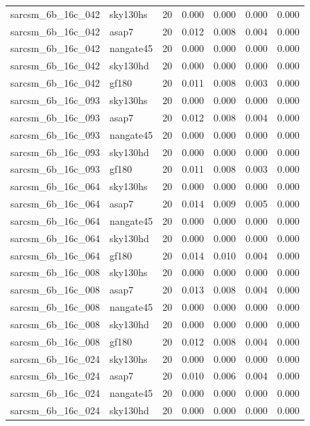 \begin{tabular}{llrrrrr}
sarcsm\_6b\_16c\_042 & sky130hs & 20 & 0.000 & 0.000 & 0.000 & 0.000 \\
sarcsm\_6b\_16c\_042 & asap7 & 20 & 0.012 & 0.008 & 0.004 & 0.000 \\
sarcsm\_6b\_16c\_042 & nangate45 & 20 & 0.000 & 0.000 & 0.000 & 0.000 \\
sarcsm\_6b\_16c\_042 & sky130hd & 20 & 0.000 & 0.000 & 0.000 & 0.000 \\
sarcsm\_6b\_16c\_042 & gf180 & 20 & 0.011 & 0.008 & 0.003 & 0.000 \\
sarcsm\_6b\_16c\_093 & sky130hs & 20 & 0.000 & 0.000 & 0.000 & 0.000 \\
sarcsm\_6b\_16c\_093 & asap7 & 20 & 0.012 & 0.008 & 0.004 & 0.000 \\
sarcsm\_6b\_16c\_093 & nangate45 & 20 & 0.000 & 0.000 & 0.000 & 0.000 \\
sarcsm\_6b\_16c\_093 & sky130hd & 20 & 0.000 & 0.000 & 0.000 & 0.000 \\
sarcsm\_6b\_16c\_093 & gf180 & 20 & 0.011 & 0.008 & 0.003 & 0.000 \\
sarcsm\_6b\_16c\_064 & sky130hs & 20 & 0.000 & 0.000 & 0.000 & 0.000 \\
sarcsm\_6b\_16c\_064 & asap7 & 20 & 0.014 & 0.009 & 0.005 & 0.000 \\
sarcsm\_6b\_16c\_064 & nangate45 & 20 & 0.000 & 0.000 & 0.000 & 0.000 \\
sarcsm\_6b\_16c\_064 & sky130hd & 20 & 0.000 & 0.000 & 0.000 & 0.000 \\
sarcsm\_6b\_16c\_064 & gf180 & 20 & 0.014 & 0.010 & 0.004 & 0.000 \\
sarcsm\_6b\_16c\_008 & sky130hs & 20 & 0.000 & 0.000 & 0.000 & 0.000 \\
sarcsm\_6b\_16c\_008 & asap7 & 20 & 0.013 & 0.008 & 0.004 & 0.000 \\
sarcsm\_6b\_16c\_008 & nangate45 & 20 & 0.000 & 0.000 & 0.000 & 0.000 \\
sarcsm\_6b\_16c\_008 & sky130hd & 20 & 0.000 & 0.000 & 0.000 & 0.000 \\
sarcsm\_6b\_16c\_008 & gf180 & 20 & 0.012 & 0.008 & 0.004 & 0.000 \\
sarcsm\_6b\_16c\_024 & sky130hs & 20 & 0.000 & 0.000 & 0.000 & 0.000 \\
sarcsm\_6b\_16c\_024 & asap7 & 20 & 0.010 & 0.006 & 0.004 & 0.000 \\
sarcsm\_6b\_16c\_024 & nangate45 & 20 & 0.000 & 0.000 & 0.000 & 0.000 \\
sarcsm\_6b\_16c\_024 & sky130hd & 20 & 0.000 & 0.000 & 0.000 & 0.000 \\

\end{tabular}
